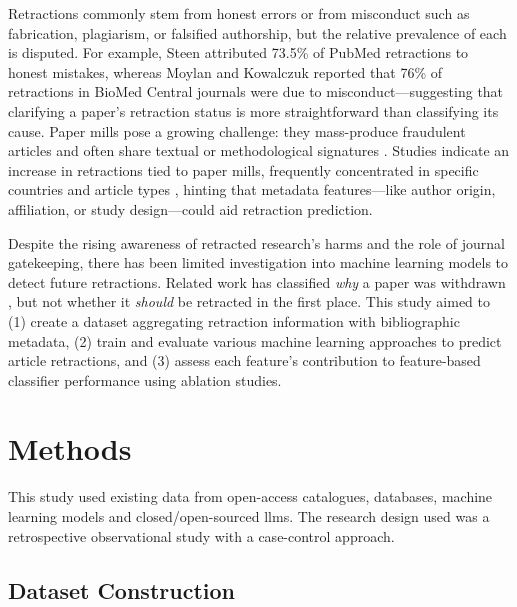 \documentclass[pdflatex,sn-mathphys-num]{sn-jnl}
\begin{document}
Retractions commonly stem from honest errors or from misconduct such as fabrication, plagiarism, or falsified authorship, but the relative prevalence of each is disputed. For example, Steen \cite{steen_retractions_2011} attributed 73.5\% of PubMed retractions to honest mistakes, whereas Moylan and Kowalczuk \cite{moylan_why_2016} reported that 76\% of retractions in BioMed Central journals were due to misconduct—suggesting that clarifying a paper’s retraction status is more straightforward than classifying its cause. Paper mills pose a growing challenge: they mass-produce fraudulent articles and often share textual or methodological signatures \cite{doi:10.1126/science.342.6162.1035, doi:10.3138/jsp.49.3.02, publications4020009}. Studies indicate an increase in retractions tied to paper mills, frequently concentrated in specific countries and article types \cite{candal-pedreira_retracted_2022,gaudino_trends_2021,https://doi.org/10.1002/1873-3468.13747}, hinting that metadata features—like author origin, affiliation, or study design—could aid retraction prediction.

Despite the rising awareness of retracted research’s harms and the role of journal gatekeeping, there has been limited investigation into machine learning models to detect future retractions. Related work has classified \emph{why} a paper was withdrawn \cite{rao_withdrarxiv_2024}, but not whether it \emph{should} be retracted in the first place. This study aimed to (1) create a dataset aggregating retraction information with bibliographic metadata, (2) train and evaluate various machine learning approaches to predict article retractions, and (3) assess each feature's contribution to feature-based classifier performance using ablation studies.

\section{Methods}

This study used existing data from open-access catalogues, databases, machine learning models and closed/open-sourced \glspl{llm}.  The research design used was a retrospective observational study with a case-control approach.

\subsection{Dataset Construction}\label{sec:datagen}
\end{document}
